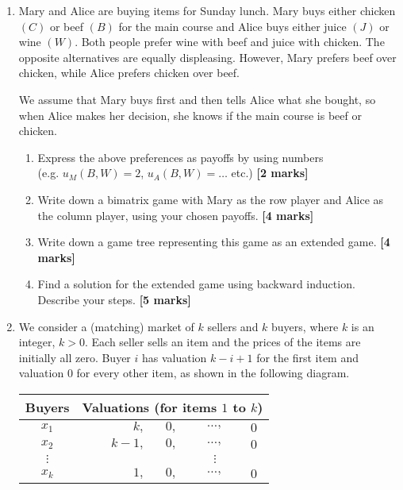 \documentclass{article}
\begin{document}
\begin{enumerate}
	\newpage




	\item[\textbf{Exercise 3.}]   %

Mary and Alice are buying items for Sunday lunch. Mary buys either chicken $(C)$ or beef $(B)$ for the main course and Alice buys either juice $(J)$ 
or wine $(W)$. Both people prefer wine with beef and juice with chicken. The opposite alternatives are equally displeasing.
However, Mary prefers beef over chicken, while Alice prefers chicken over beef.

We assume that Mary buys first and then tells Alice what she bought,
so when Alice makes her decision, she knows if the main course is beef or chicken.

\begin{enumerate}
\item[(a)] Express the above preferences as payoffs by using numbers\\(e.g.
 $u_M(B,W) = 2$, $u_A(B,W) = \ldots$  etc.)               \hfill{\bf [2 marks]}\smallskip
\item[(b)] Write down a bimatrix game with Mary as the row player 
and Alice as the column player, using your chosen payoffs.           \hfill{\bf [4 marks]}\smallskip
\item[(c)] Write down a game tree representing this game as an extended game.  \hfill{\bf [4 marks]}\smallskip
\item[(d)] Find a solution for the extended game using backward induction.\\Describe your steps.  \hfill{\bf [5 marks]}\smallskip
\end{enumerate}
	\vspace*{0.8cm}


	
	\item[\textbf{Exercise 4.}]  %
	
	We consider a (matching) market of $k$ sellers and $k$ buyers, where $k$ is an integer, $k>0$. 
	Each seller sells an item and the prices of the items are initially all zero. Buyer $i$ has valuation $k-i+1$ for the first item and valuation $0$ for every other item, as shown in the following diagram.
	
	\vspace*{0.5cm}
	\begin{tabular}{c r c c c}
		Buyers & \multicolumn{4}{c}{Valuations (for items $1$ to $k$)} \\
		\hline
		$x_1$ & $k,$ & $0,$ & $\ldots,$ & $0$ \\
		$x_2$ & $k-1,$ & $0,$ & $\ldots,$ & $0$ \\
		$\vdots$ & & & $\vdots$ \\
		$x_k$ & $1,$ & $0,$ & $\ldots,$ & $0$ \\
	\end{tabular}
	

\end{enumerate}
\end{document}
